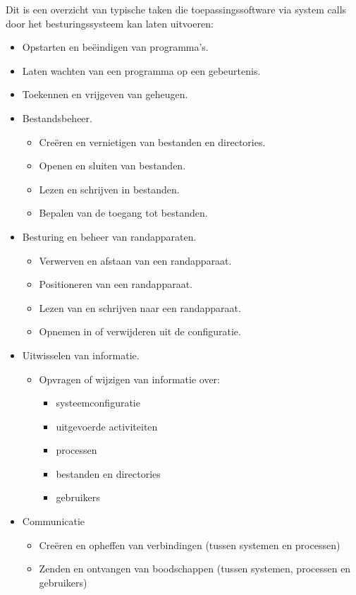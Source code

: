 Dit is een overzicht van typische taken die toepassingssoftware
via system calls door het besturingssysteem kan laten
uitvoeren:

\begin{itemize}
\item Opstarten en be\"eindigen van programma's.
\item Laten wachten van een programma op een gebeurtenis.
\item Toekennen en vrijgeven van geheugen.
\item Bestandsbeheer.
  \begin{itemize}
  \item Cre\"eren en vernietigen van bestanden en directories.
  \item Openen en sluiten van bestanden.
  \item Lezen en schrijven in bestanden.
  \item Bepalen van de toegang tot bestanden.
  \end{itemize}
\item Besturing en beheer van randapparaten.
  \begin{itemize}
  \item Verwerven en afstaan van een randapparaat.
  \item Positioneren van een randapparaat.
  \item Lezen van en schrijven naar een randapparaat.
  \item Opnemen in of verwijderen uit de configuratie.
  \end{itemize}
\item Uitwisselen van informatie.
  \begin{itemize}
  \item Opvragen of wijzigen van informatie over:
    \begin{itemize}
    \item systeemconfiguratie
    \item uitgevoerde activiteiten
    \item processen
    \item bestanden en directories
    \item gebruikers
    \end{itemize}
  \end{itemize}
\item Communicatie
  \begin{itemize}
  \item Cre\"eren en opheffen van verbindingen (tussen systemen en processen)
  \item Zenden en ontvangen van boodschappen (tussen systemen, processen en
gebruikers)
  \end{itemize}
\end{itemize}

